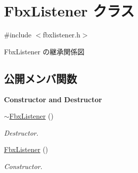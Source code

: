 \hypertarget{class_fbx_listener}{}\section{Fbx\+Listener クラス}
\label{class_fbx_listener}


{\ttfamily \#include $<$fbxlistener.\+h$>$}



Fbx\+Listener の継承関係図
\subsection*{公開メンバ関数}
\begin{Indent}\textbf{ Constructor and Destructor}\par
\begin{DoxyCompactItemize}
\item 
\hyperlink{class_fbx_listener_a47f9225b672464b671e7d260fba28fa3}{$\sim$\+Fbx\+Listener} ()
\begin{DoxyCompactList}\small\item\em Destructor. \end{DoxyCompactList}\item 
\hyperlink{class_fbx_listener_a8d0059633c0a29709abd105fb4f911ec}{Fbx\+Listener} ()
\begin{DoxyCompactList}\small\item\em Constructor. \end{DoxyCompactList}\end{DoxyCompactItemize}
\end{Indent}
